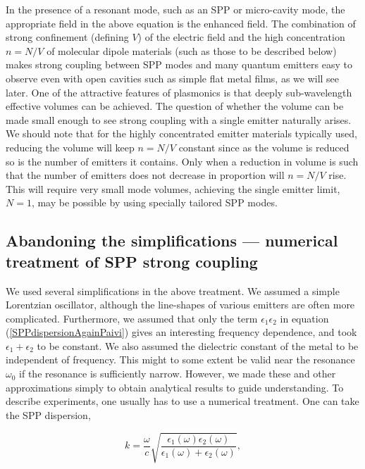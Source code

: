 \documentclass[12pt]{iopart}
\begin{document}
\noindent In the presence of a resonant mode, such as an SPP or micro-cavity mode, the appropriate field in the above equation is the enhanced field. The combination of strong confinement (defining $V$) of the electric field and the high concentration $n=N/V$ of molecular dipole materials (such as those to be described below) makes strong coupling between SPP modes and many quantum emitters easy to observe even with open cavities such as simple flat metal films, as we will see later. One of the attractive features of plasmonics is that deeply sub-wavelength effective volumes can be achieved. 
The question of whether the volume can be made small enough to see strong coupling with a single emitter 
naturally arises. We should note that for the highly concentrated emitter materials typically used, reducing the volume 
will keep $n=N/V$ constant since as the volume is reduced so is the number of emitters it contains. Only when a reduction in volume is such that the number of emitters does not decrease in proportion will $n=N/V$ rise. This will require very small mode volumes, achieving the single emitter limit, $N=1$, may be possible by using specially tailored SPP modes.  

\subsection{Abandoning the simplifications --- numerical treatment of SPP strong coupling}

We used several simplifications in the above treatment. We assumed a simple Lorentzian oscillator, although the 
line-shapes of various emitters are often more complicated. Furthermore, we assumed that only the term $\epsilon_1\epsilon_2$ in equation (\ref{SPPdispersionAgainPaivi}) gives an interesting frequency dependence, and took $\epsilon_1+\epsilon_2$ to be constant. We also assumed the dielectric constant of the metal to be independent of frequency. This might to some extent be valid near the resonance $\omega_0$ if the resonance is sufficiently narrow. However, we made these and other approximations simply to obtain analytical results to guide understanding. To describe experiments, one usually has to use a numerical treatment. One can take the SPP dispersion,
 
\begin{equation}
k =  \frac{\omega}{c} \sqrt{\frac{\epsilon_1(\omega) \epsilon_2 (\omega)}{\epsilon_1 (\omega) + \epsilon_2 (\omega)}},
\end{equation}
\end{document}
